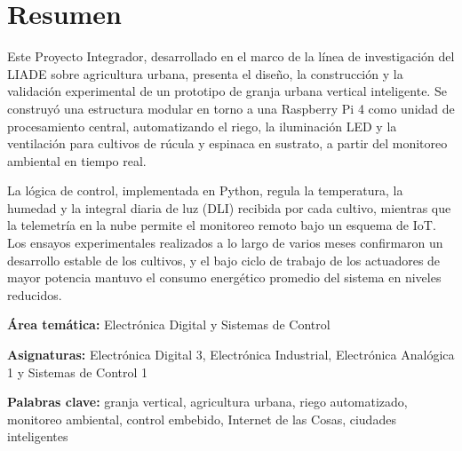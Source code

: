 \chapter*{Resumen}

Este Proyecto Integrador, desarrollado en el marco de la línea de investigación del LIADE sobre agricultura urbana, presenta el diseño, la construcción y la validación experimental de un prototipo de granja urbana vertical inteligente. Se construyó una estructura modular en torno a una Raspberry Pi 4 como unidad de procesamiento central, automatizando el riego, la iluminación LED y la ventilación para cultivos de rúcula y espinaca en sustrato, a partir del monitoreo ambiental en tiempo real.

La lógica de control, implementada en Python, regula la temperatura, la humedad y la integral diaria de luz (DLI) recibida por cada cultivo, mientras que la telemetría en la nube permite el monitoreo remoto bajo un esquema de IoT. Los ensayos experimentales realizados a lo largo de varios meses confirmaron un desarrollo estable de los cultivos, y el bajo ciclo de trabajo de los actuadores de mayor potencia mantuvo el consumo energético promedio del sistema en niveles reducidos.

\vspace{0.8cm}

\noindent\textbf{Área temática:} Electrónica Digital y Sistemas de Control

\vspace{0.4cm}

\noindent\textbf{Asignaturas:} Electrónica Digital 3, Electrónica Industrial, Electrónica Analógica 1 y Sistemas de Control 1

\vspace{0.4cm}

\noindent\textbf{Palabras clave:} granja vertical, agricultura urbana, riego automatizado, monitoreo ambiental, control embebido, Internet de las Cosas, ciudades inteligentes